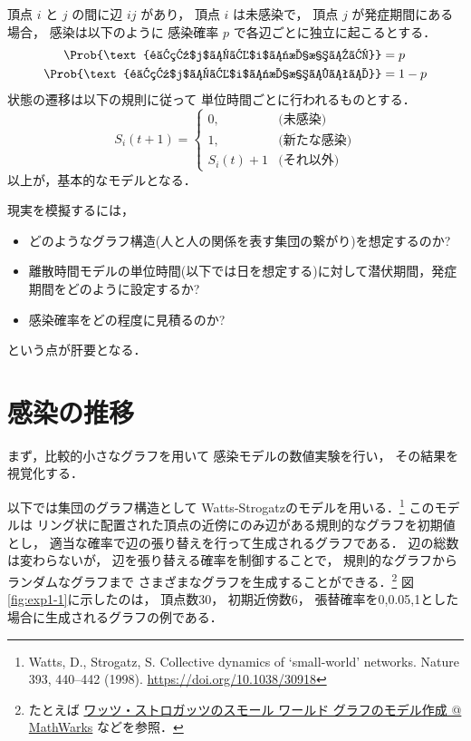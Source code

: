 \documentclass[10pt,oneside]{scrartcl}
\begin{document}
頂点 \(i\) と \(j\) の間に辺 \(ij\) があり，
頂点 \(i\) は未感染で，
頂点 \(j\) が発症期間にある場合，
感染は以下のように
感染確率 \(p\) で各辺ごとに独立に起こるとする．
\begin{align}
  \Prob{\text{頂点$j$から$i$に感染する}} &=p\\
  \Prob{\text{頂点$j$から$i$に感染しない}}&=1-p
\end{align}
状態の遷移は以下の規則に従って
単位時間ごとに行われるものとする．
\begin{equation}
  S_{i}(t+1)
  =
  \begin{cases}
    0,&\text{(未感染)}\\
    1,&\text{(新たな感染)}\\
    S_{i}(t)+1&\text{(それ以外)}
  \end{cases}
\end{equation}
以上が，基本的なモデルとなる．

現実を模擬するには，
\begin{itemize}
\item どのようなグラフ構造(人と人の関係を表す集団の繋がり)を想定するのか?
\item 離散時間モデルの単位時間(以下では日を想定する)に対して潜伏期間，発症期間をどのように設定するか?
\item 感染確率をどの程度に見積るのか?
\end{itemize}
という点が肝要となる．

\section{感染の推移}
\label{sec:org56cd8ed}

まず，比較的小さなグラフを用いて
感染モデルの数値実験を行い，
その結果を視覚化する．

以下では集団のグラフ構造として
Watts-Strogatzのモデルを用いる．\footnote{Watts, D., Strogatz, S. Collective dynamics of ‘small-world’ networks. Nature 393, 440–442 (1998). \url{https://doi.org/10.1038/30918}}
このモデルは
リング状に配置された頂点の近傍にのみ辺がある規則的なグラフを初期値とし，
適当な確率で辺の張り替えを行って生成されるグラフである．
辺の総数は変わらないが，
辺を張り替える確率を制御することで，
規則的なグラフからランダムなグラフまで
さまざまなグラフを生成することができる．\footnote{たとえば \href{https://jp.mathworks.com/help/matlab/math/build-watts-strogatz-small-world-graph-model.html}{ワッツ・ストロガッツのスモール ワールド グラフのモデル作成 @ MathWarks} 
などを参照．}
図\ref{fig:exp1-1}に示したのは，
頂点数30，
初期近傍数6，
張替確率を0,0.05,1とした場合に生成されるグラフの例である．
\end{document}
